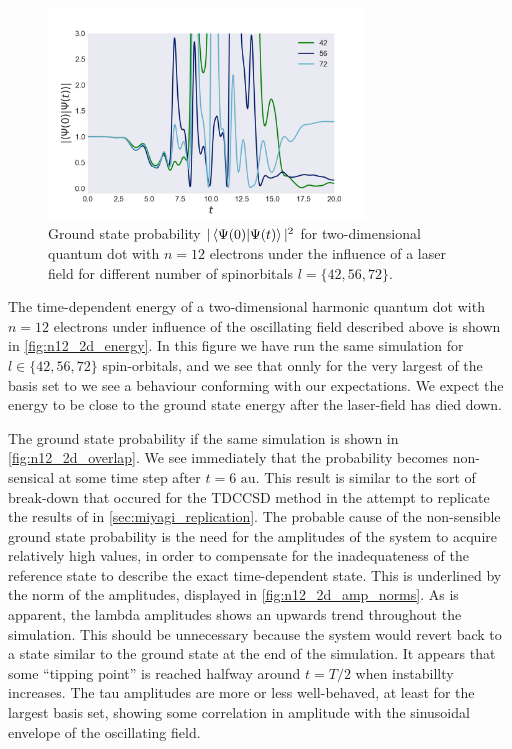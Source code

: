 \begin{figure}
    \centering
    \includegraphics[width=0.75\textwidth]{results/figures/2D/n12_overlap.png} 
    \caption{Ground state probability $|\braket{\Psi(0)}{\Psi(t)}|^2$ for two-dimensional
        quantum dot with $n=12$ electrons under the influence of a laser field for 
        different number of spinorbitals $l=\{42,56,72\}$. 
    }
    \label{fig:n12_2d_overlap}
\end{figure}

The time-dependent energy of a two-dimensional harmonic quantum dot with $n=12$
electrons under influence of the oscillating field described above is shown in 
\autoref{fig:n12_2d_energy}. In this figure we have run the same simulation for 
$l\in\{42,56,72\}$ spin-orbitals, and we see that onnly for the very largest of the 
basis set to we see a behaviour conforming with our expectations. We expect the 
energy to be close to the ground state energy after the laser-field has died down.

The ground state probability if the same simulation is shown in
\autoref{fig:n12_2d_overlap}. We see immediately that the probability becomes 
non-sensical at some time step after $t=6 \text{ au}$. This result is similar to
the sort of break-down that occured for the TDCCSD method in the attempt to 
replicate the results of \citeauthor{miyagi2013time}\cite{miyagi2013time} in
\autoref{sec:miyagi_replication}. The probable cause of the non-sensible 
ground state probability is the need for the amplitudes of the system to acquire 
relatively high values, in order to compensate for the inadequateness of the 
reference state to describe the exact time-dependent state. This is underlined 
by the norm of the amplitudes, displayed in \autoref{fig:n12_2d_amp_norms}. As 
is apparent, the lambda amplitudes shows an upwards trend throughout the 
simulation.
This should be unnecessary because the system would revert back to a state 
similar to the ground state at the end of the simulation. It appears that 
some ``tipping point'' is reached halfway around $t=T/2$ when instabillty 
increases. The tau amplitudes are more or less well-behaved, at least for 
the largest basis set, showing some correlation in amplitude with the
sinusoidal envelope of the oscillating field.

